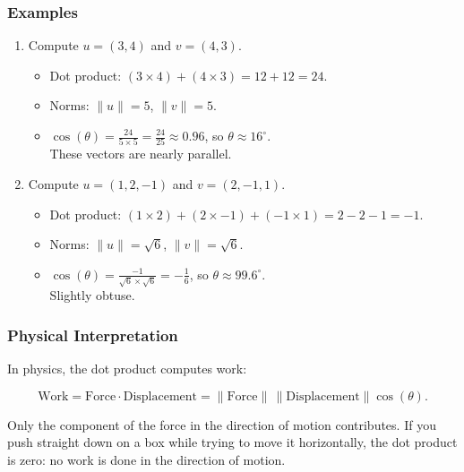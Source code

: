\documentclass[
  letterpaper,
  DIV=11,
  numbers=noendperiod]{scrreprt}
\providecommand{\tightlist}{%
  \setlength{\itemsep}{0pt}\setlength{\parskip}{0pt}}
\begin{document}
\subsubsection{Examples}\label{examples}

\begin{enumerate}
\def\labelenumi{\arabic{enumi}.}
\item
  Compute \(u = (3, 4)\) and \(v = (4, 3)\).

  \begin{itemize}
  \tightlist
  \item
    Dot product: \((3 \times 4) + (4 \times 3) = 12 + 12 = 24\).\\
  \item
    Norms: \(\|u\| = 5\), \(\|v\| = 5\).\\
  \item
    \(\cos(\theta) = \tfrac{24}{5 \times 5} = \tfrac{24}{25} \approx 0.96\),
    so \(\theta \approx 16^\circ\).\\
    These vectors are nearly parallel.
  \end{itemize}
\item
  Compute \(u = (1, 2, -1)\) and \(v = (2, -1, 1)\).

  \begin{itemize}
  \tightlist
  \item
    Dot product:
    \((1 \times 2) + (2 \times -1) + (-1 \times 1) = 2 - 2 - 1 = -1\).\\
  \item
    Norms: \(\|u\| = \sqrt{6}\), \(\|v\| = \sqrt{6}\).\\
  \item
    \(\cos(\theta) = \tfrac{-1}{\sqrt{6} \times \sqrt{6}} = -\tfrac{1}{6}\),
    so \(\theta \approx 99.6^\circ\).\\
    Slightly obtuse.
  \end{itemize}
\end{enumerate}

\subsubsection{Physical Interpretation}\label{physical-interpretation}

In physics, the dot product computes work:

\[
\text{Work} = \text{Force} \cdot \text{Displacement}
           = \|\text{Force}\| \, \|\text{Displacement}\| \cos(\theta).
\]

Only the component of the force in the direction of motion contributes.
If you push straight down on a box while trying to move it horizontally,
the dot product is zero: no work is done in the direction of motion.
\end{document}
